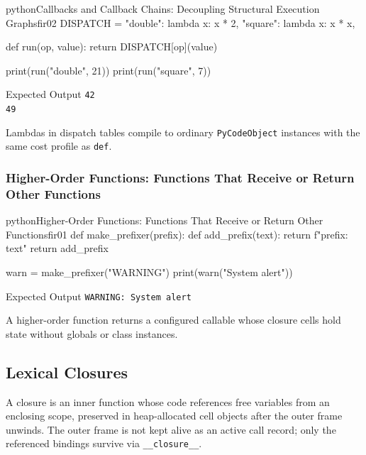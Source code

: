 \documentclass[a4paper,twoside]{report}
\begin{document}
\begin{codebox}[]{python}{Callbacks and Callback Chains: Decoupling Structural Execution Graphs}{fir02}
DISPATCH = {
    "double": lambda x: x * 2,
    "square": lambda x: x * x,
}

def run(op, value):
    return DISPATCH[op](value)

print(run("double", 21))
print(run("square", 7))
\end{codebox}


\begin{iobox}{Expected Output}
\texttt{42} \\
\texttt{49} \\
\end{iobox}




Lambdas in dispatch tables compile to ordinary \texttt{PyCodeObject} instances with the same cost profile as \texttt{def}.

\subsubsection{Higher-Order Functions: Functions That Receive or Return Other Functions}

\begin{codebox}[]{python}{Higher-Order Functions: Functions That Receive or Return Other Functions}{fir01}
def make_prefixer(prefix):
    def add_prefix(text):
        return f"{prefix}: {text}"
    return add_prefix

warn = make_prefixer("WARNING")
print(warn("System alert"))
\end{codebox}


\begin{iobox}{Expected Output}
\texttt{WARNING: System alert} \\
\end{iobox}




A higher-order function returns a configured callable whose closure cells hold state without globals or class instances.


\subsection{Lexical Closures}

A closure is an inner function whose code references free variables from an enclosing scope, preserved in heap-allocated cell objects after the outer frame unwinds. The outer frame is not kept alive as an active call record; only the referenced bindings survive via \texttt{\_\_closure\_\_}.
\end{document}
